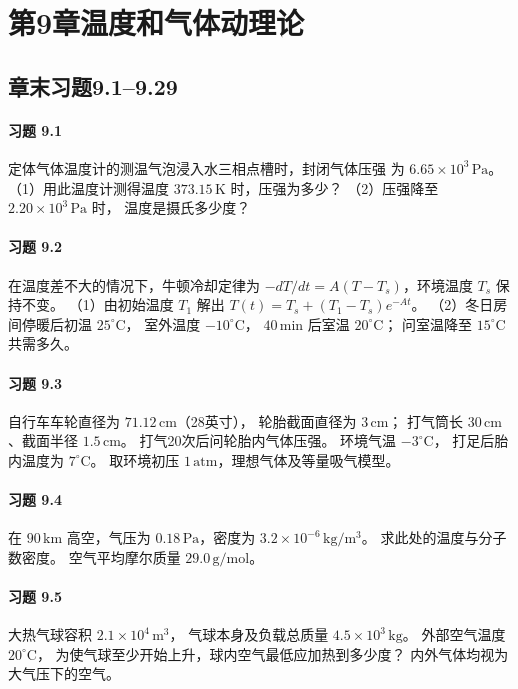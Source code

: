 \section*{第9章\quad 温度和气体动理论}
\subsection*{章末习题9.1--9.29}

\paragraph{习题 9.1}
定体气体温度计的测温气泡浸入水三相点槽时，封闭气体压强
为 \(6.65\times10^3\,\mathrm{Pa}\)。
（1）用此温度计测得温度 \(373.15\,\mathrm K\) 时，压强为多少？
（2）压强降至 \(2.20\times10^3\,\mathrm{Pa}\) 时，
温度是摄氏多少度？

\paragraph{习题 9.2}
在温度差不大的情况下，牛顿冷却定律为
\(-dT/dt=A(T-T_s)\)，环境温度 \(T_s\) 保持不变。
（1）由初始温度 \(T_1\) 解出
\(T(t)=T_s+(T_1-T_s)e^{-At}\)。
（2）冬日房间停暖后初温 \(25^\circ\mathrm C\)，
室外温度 \(-10^\circ\mathrm C\)，
\(40\,\mathrm{min}\) 后室温 \(20^\circ\mathrm C\)；
问室温降至 \(15^\circ\mathrm C\) 共需多久。

\paragraph{习题 9.3}
自行车车轮直径为 \(71.12\,\mathrm{cm}\)（28英寸），
轮胎截面直径为 \(3\,\mathrm{cm}\)；
打气筒长 \(30\,\mathrm{cm}\)、截面半径 \(1.5\,\mathrm{cm}\)。
打气20次后问轮胎内气体压强。
环境气温 \(-3^\circ\mathrm C\)，
打足后胎内温度为 \(7^\circ\mathrm C\)。
取环境初压 \(1\,\mathrm{atm}\)，理想气体及等量吸气模型。

\paragraph{习题 9.4}
在 \(90\,\mathrm{km}\) 高空，气压为
\(0.18\,\mathrm{Pa}\)，密度为
\(3.2\times10^{-6}\,\mathrm{kg/m^3}\)。
求此处的温度与分子数密度。
空气平均摩尔质量 \(29.0\,\mathrm{g/mol}\)。

\paragraph{习题 9.5}
大热气球容积 \(2.1\times10^4\,\mathrm{m^3}\)，
气球本身及负载总质量 \(4.5\times10^3\,\mathrm{kg}\)。
外部空气温度 \(20^\circ\mathrm C\)，
为使气球至少开始上升，球内空气最低应加热到多少度？
内外气体均视为大气压下的空气。

